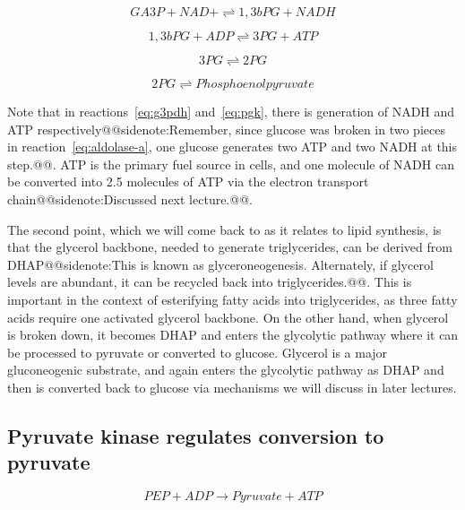\documentclass{tufte-handout}
\makeatletter
\def\sidenote#1{@@sidenote:#1@@}
\makeatother
\begin{document}
\begin{equation}\label{eq:g3pdh}
GA3P + NAD+ \rightleftharpoons 1,3bPG  + NADH
\end{equation}

\begin{equation}\label{eq:pgk}
1,3bPG + ADP \rightleftharpoons 3PG + ATP
\end{equation}

\begin{equation}
3PG \rightleftharpoons 2PG
\end{equation}

\begin{equation}
2PG \rightleftharpoons Phosphoenolpyruvate
\end{equation}

Note that in reactions~\ref{eq:g3pdh} and~\ref{eq:pgk}, there is generation of NADH and ATP respectively\sidenote{Remember, since glucose was broken in two pieces in reaction~\ref{eq:aldolase-a}, one glucose generates two ATP and two NADH at this step.}.  ATP is the primary fuel source in cells, and one molecule of NADH can be converted into 2.5 molecules of ATP via the electron transport chain\sidenote{Discussed next lecture.}.  

The second point, which we will come back to as it relates to lipid synthesis, is that the glycerol backbone, needed to generate triglycerides, can be derived from DHAP\sidenote{This is known as glyceroneogenesis.  Alternately, if glycerol levels are abundant, it can be recycled back into triglycerides.}.  This is important in the context of esterifying fatty acids into triglycerides, as three fatty acids require one activated glycerol backbone.  On the other hand, when glycerol is broken down, it becomes DHAP and enters the glycolytic pathway where it can be processed to pyruvate or converted to glucose.  Glycerol is a major gluconeogenic substrate, and again enters the glycolytic pathway as DHAP and then is converted back to glucose via mechanisms we will discuss in later lectures.

\subsection{Pyruvate kinase regulates conversion to pyruvate}

\begin{equation}\label{eq:pk}
PEP + ADP \rightarrow Pyruvate + ATP
\end{equation}
\end{document}
